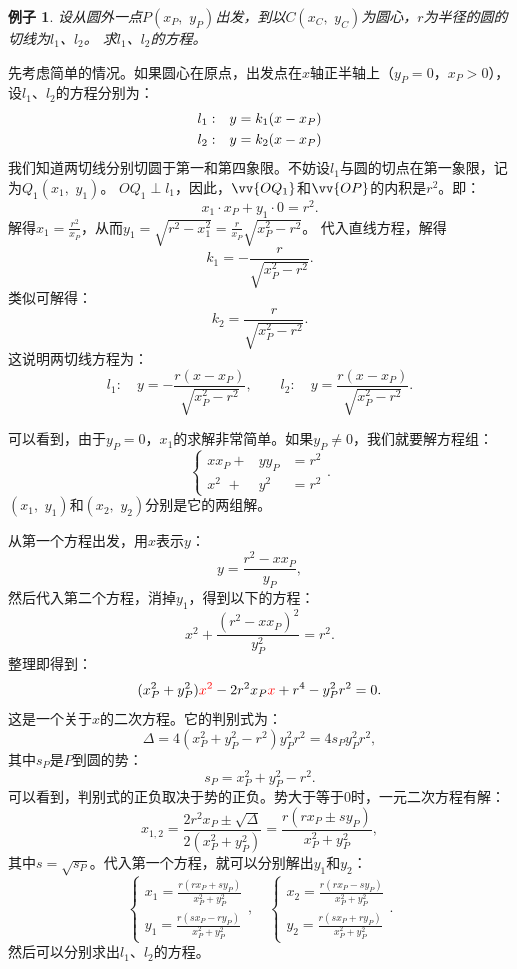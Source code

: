 \documentclass[12pt,UTF8]{ctexbook}
\newtheorem{ex}{例子}[section]
\begin{document}
\begin{ex}\label{ex:0-0-0}
    设从圆外一点$P(x_P, \,\,y_P)$出发，到以$C(x_C,\,\,y_C)$为圆心，$r$为半径的圆的切线为$l_1$、$l_2$。
    求$l_1$、$l_2$的方程。
\end{ex}

先考虑简单的情况。如果圆心在原点，出发点在$x$轴正半轴上（$y_P = 0$，$x_P>0$），设$l_1$、$l_2$的方程分别为：
\begin{align}
    l_1:\quad & y = k_1(x - x_P) \notag \\
    l_2:\quad & y = k_2(x - x_P) \notag 
\end{align}
我们知道两切线分别切圆于第一和第四象限。不妨设$l_1$与圆的切点在第一象限，记为$Q_1(x_1,\,\,y_1)$。
$OQ_1\perp l_1$，因此，$\vv{OQ_1}$和$\vv{OP}$的内积是$r^2$。即：
$$ x_1\cdot x_P + y_1\cdot 0 = r^2.$$
解得$x_1 = \frac{r^2}{x_P}$，从而$y_1 = \sqrt{r^2 - x_1^2} = \frac{r}{x_P}\sqrt{x_P^2 - r^2}$。
代入直线方程，解得
$$k_1 = -\frac{r}{\sqrt{x_P^2 - r^2}}.$$
类似可解得：
$$k_2 = \frac{r}{\sqrt{x_P^2 - r^2}}.$$
这说明两切线方程为：
$$l_1: \quad y = -\frac{r(x - x_P)}{\sqrt{x_P^2 - r^2}}, \qquad l_2:\quad y = \frac{r(x - x_P)}{\sqrt{x_P^2 - r^2}}.$$

可以看到，由于$y_P = 0$，$x_1$的求解非常简单。如果$y_P \neq 0$，我们就要解方程组：
$$ 
  \left\{ \begin{array}{rrc}
    x x_P +& y y_P &= r^2 \\
    x^2\,\, +& y^2 &= r^2
  \end{array}\right. .
$$
$(x_1, \,\,y_1)$和$(x_2,\,\,y_2)$分别是它的两组解。

从第一个方程出发，用$x$表示$y$：
$$ y = \frac{r^2 - xx_P}{y_P},$$
然后代入第二个方程，消掉$y_1$，得到以下的方程：
$$ x^2 + \frac{(r^2 - xx_P)^2}{y_P^2} = r^2.$$
整理即得到：
$$ (x_P^2+y_P^2){\color{red}x^2} - 2r^2x_P{\color{red}x} + r^4 - y_P^2r^2 = 0.$$
这是一个关于$x$的二次方程。它的判别式为：
$$\Delta = 4(x_P^2+y_P^2 - r^2)y_P^2r^2 = 4s_Py_P^2r^2,$$
其中$s_P$是$P$到圆的势：
$$ s_P = x_P^2+y_P^2 - r^2. $$
可以看到，判别式的正负取决于势的正负。势大于等于$0$时，一元二次方程有解：
$$x_{1,2} = \frac{2r^2x_P \pm \sqrt{\Delta} }{2(x_P^2+y_P^2)} =  \frac{r(rx_P \pm sy_P) }{x_P^2+y_P^2}, $$
其中$s = \sqrt{s_P}$。代入第一个方程，就可以分别解出$y_1$和$y_2$：
$$
    \left\{ \begin{array}{rrc}
        x_1 = \frac{r(rx_P + sy_P) }{x_P^2+y_P^2} \\
        y_1 = \frac{r(sx_P - ry_P)}{x_P^2+y_P^2}
    \end{array}\right., 
    \quad
    \left\{ \begin{array}{rrc}
        x_2 = \frac{r(rx_P - sy_P) }{x_P^2+y_P^2} \\
        y_2 = \frac{r(sx_P + ry_P)}{x_P^2+y_P^2}
    \end{array}\right..
$$
然后可以分别求出$l_1$、$l_2$的方程。
\end{document}

